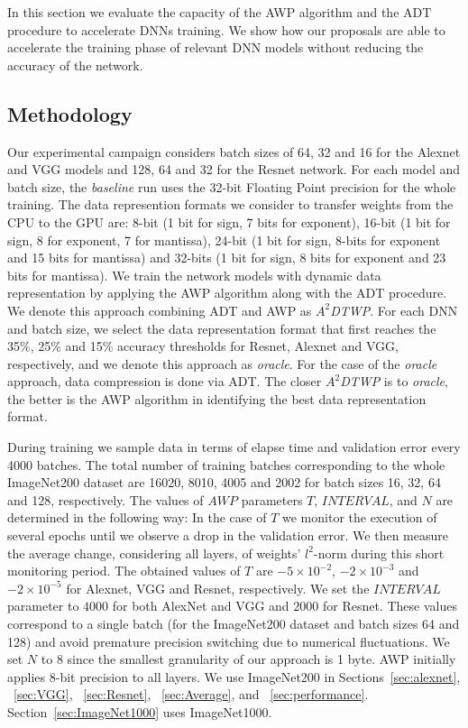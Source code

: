 In this section we evaluate the capacity of the AWP algorithm and the ADT 
procedure to accelerate DNNs training.  We show how our proposals are able to 
accelerate the training phase of relevant DNN models without reducing the 
accuracy of the network. 

\subsection{Methodology}
\label{sec:evaluation1}

Our experimental campaign considers batch sizes of 64, 32 and 16 for the Alexnet 
and VGG models and 128, 64 and 32 for the Resnet network.
For each model and batch size, the \emph{baseline} run uses the 32-bit Floating 
Point precision for the whole training.  The data represention formats we 
consider to transfer weights from the CPU to the GPU are:
8-bit (1 bit for sign, 7 bits for exponent), 16-bit (1 bit for sign, 8 for 
exponent, 7 for mantissa), 24-bit (1 bit for sign, 8-bits for exponent and 15 
bits for mantissa) and 32-bits (1 bit for sign, 8 bits for exponent and 23 bits 
for mantissa).
We train the network models with dynamic data representation by applying the AWP 
algorithm along with the ADT procedure.
We denote this approach combining ADT and AWP as \textit{$A^2$DTWP}.  For each 
DNN and batch size, we select the data representation format that first reaches 
the 35\%, 25\% and 15\% accuracy thresholds for Resnet, Alexnet and VGG, 
respectively, and we denote this approach as \emph{oracle}.
For the case of the \emph{oracle} approach, data compression is done via ADT.
The closer \textit{$A^2$DTWP} is to \emph{oracle}, the better is the AWP 
algorithm in identifying the best data representation format.

During training we sample data in terms of elapse time and validation error 
every 4000 batches.  The total number of training batches corresponding to the 
whole ImageNet200 dataset are 16020, 8010, 4005 and 2002 for batch sizes 16, 32, 
64 and 128, respectively.
The values of $AWP$ parameters $T$, $INTERVAL$, and $N$ are determined in the 
following way:
In the case of $T$ we monitor the execution of several epochs until we observe a 
drop in the validation error.  We then measure the average change, considering 
all layers, of weights' $l^2$-norm during this short monitoring period.
The obtained values of $T$ are $-5\times10^{-2}$, $-2\times10^{-3}$ and 
$-2\times10^{-5}$ for Alexnet, VGG and Resnet, respectively.
We set the $INTERVAL$ parameter to $4000$ for both AlexNet and VGG and $2000$ 
for Resnet.  These values correspond to a single batch (for the ImageNet200 
dataset and batch sizes 64 and 128) and avoid premature precision switching due 
to numerical fluctuations.  We set $N$ to $8$ since the smallest granularity of 
our approach is 1 byte.
AWP initially applies 8-bit precision to all layers.
We use ImageNet200 in Sections~\ref{sec:alexnet}, ~\ref{sec:VGG}, 
~\ref{sec:Resnet}, ~\ref{sec:Average}, and ~\ref{sec:performance}.
Section~\ref{sec:ImageNet1000} uses ImageNet1000.

